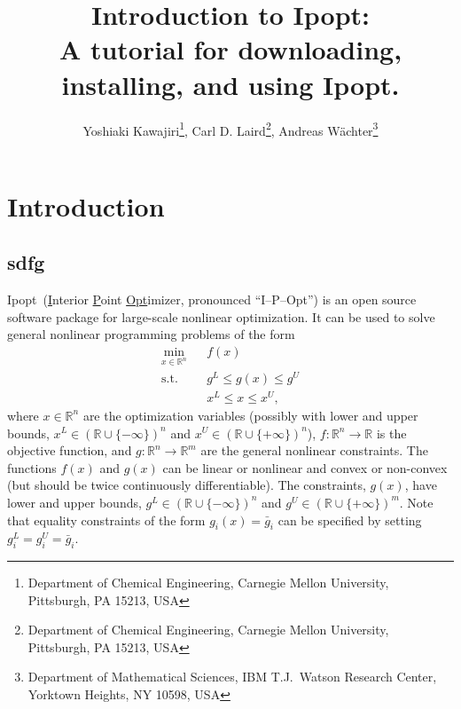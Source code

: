 \documentclass[letter,10pt]{article}
\newcommand{\RR}{{\mathbb{R}}}
\newcommand{\Ipopt}{{\sc Ipopt}}
\begin{document}
\title{Introduction to \Ipopt:\\
A tutorial for downloading, installing, and using \Ipopt.}

\author{Yoshiaki Kawajiri\footnote{Department of Chemical Engineering,
    Carnegie Mellon University, Pittsburgh, PA 15213, USA}, Carl D.
  Laird\footnote{Department of Chemical Engineering, Carnegie Mellon
    University, Pittsburgh, PA 15213, USA}, Andreas
  W\"achter\footnote{Department of Mathematical Sciences, IBM
    T.J.~Watson Research Center, Yorktown Heights, NY 10598, USA}}

\maketitle

\tableofcontents

\section{Introduction}
\subsection{sdfg}
\Ipopt\ (\underline{I}nterior \underline{P}oint \underline{Opt}imizer,
pronounced ``I--P--Opt'') is an open source software package for
large-scale nonlinear optimization. It can be used to solve general
nonlinear programming problems of the form
\begin{eqnarray}
\min_{x\in\RR^n} &&f(x) \label{eq:obj} \\
\mbox{s.t.} \;  &&g^L \leq g(x) \leq g^U \\
                &&x^L \leq x \leq x^U, \label{eq:bounds}
\end{eqnarray}
where $x \in \RR^n$ are the optimization variables (possibly with
lower and upper bounds, $x^L\in(\RR\cup\{-\infty\})^n$ and
$x^U\in(\RR\cup\{+\infty\})^n$), $f:\RR^n\longrightarrow\RR$ is the
objective function, and $g:\RR^n\longrightarrow \RR^m$ are the general
nonlinear constraints.  The functions $f(x)$ and $g(x)$ can be linear
or nonlinear and convex or non-convex (but should be twice
continuously differentiable). The constraints, $g(x)$, have lower and
upper bounds, $g^L\in(\RR\cup\{-\infty\})^n$ and
$g^U\in(\RR\cup\{+\infty\})^m$. Note that equality constraints of the
form $g_i(x)=\bar g_i$ can be specified by setting
$g^L_{i}=g^U_{i}=\bar g_i$.
\end{document}
